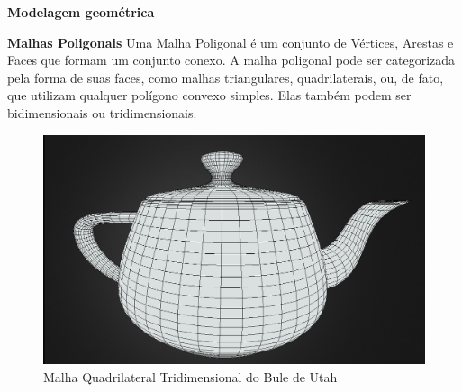\begin{frame}{{\bf \color{blue} Modelagem geométrica}}
	
	\begin{block}{\bf Malhas Poligonais}
		Uma Malha Poligonal é um conjunto de Vértices, Arestas e Faces que formam um conjunto conexo. A malha poligonal pode ser categorizada pela forma de suas faces, como malhas triangulares, quadrilaterais, ou, de fato, que utilizam qualquer polígono convexo simples. Elas também podem ser bidimensionais ou tridimensionais.
	\end{block}
	
	\begin{figure}[ht]
    \centering
        \includegraphics[width=0.5\linewidth]{imagens/Utah Teapot.PNG}
        \caption{Malha Quadrilateral Tridimensional do Bule de Utah
        \cite{utahteapot}}
        \label{fig:my_label}
    \end{figure}
\end{frame}